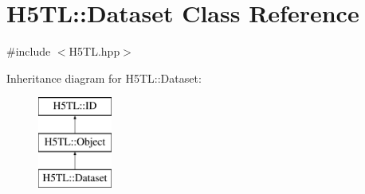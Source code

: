 \hypertarget{class_h5_t_l_1_1_dataset}{\section{H5\-T\-L\-:\-:Dataset Class Reference}
\label{class_h5_t_l_1_1_dataset}
}


{\ttfamily \#include $<$H5\-T\-L.\-hpp$>$}

Inheritance diagram for H5\-T\-L\-:\-:Dataset\-:\begin{figure}[H]
\begin{center}
\leavevmode
\includegraphics[height=3.000000cm]{class_h5_t_l_1_1_dataset}
\end{center}
\end{figure}
